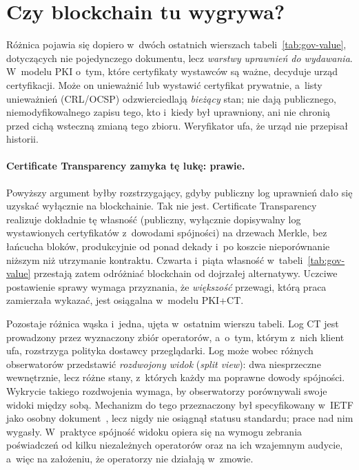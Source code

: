 \section{Czy blockchain tu wygrywa?}
\label{sec:gov-wniosek}

Różnica pojawia się dopiero w~dwóch ostatnich wierszach tabeli~\ref{tab:gov-value},
dotyczących nie pojedynczego dokumentu, lecz \emph{warstwy uprawnień do wydawania}.
W~modelu PKI o~tym, które certyfikaty wystawców są ważne, decyduje urząd certyfikacji.
Może on unieważnić lub wystawić certyfikat prywatnie, a~listy unieważnień (CRL/OCSP)
odzwierciedlają \emph{bieżący} stan; nie dają publicznego, niemodyfikowalnego
zapisu tego, kto i~kiedy był uprawniony, ani nie chronią przed cichą wsteczną
zmianą tego zbioru. Weryfikator ufa, że urząd nie przepisał historii.

\paragraph{Certificate Transparency zamyka tę lukę: prawie.} Powyższy argument
byłby rozstrzygający, gdyby publiczny log uprawnień dało się uzyskać wyłącznie
na blockchainie. Tak nie jest. Certificate Transparency~\cite{rfc6962} realizuje
dokładnie tę własność (publiczny, wyłącznie dopisywalny log wystawionych
certyfikatów z~dowodami spójności) na drzewach Merkle, bez łańcucha bloków,
produkcyjnie od ponad dekady i~po koszcie nieporównanie niższym niż utrzymanie
kontraktu. Czwarta i~piąta własność w~tabeli~\ref{tab:gov-value} przestają zatem
odróżniać blockchain od dojrzałej alternatywy. Uczciwe postawienie sprawy wymaga
przyznania, że \emph{większość} przewagi, którą praca zamierzała wykazać, jest
osiągalna w~modelu PKI+CT.

Pozostaje różnica wąska i~jedna, ujęta w~ostatnim wierszu tabeli. Log CT jest
prowadzony przez wyznaczony zbiór operatorów, a~o~tym, którym z~nich klient ufa,
rozstrzyga polityka dostawcy przeglądarki. Log może wobec różnych obserwatorów
przedstawić \emph{rozdwojony widok} (\emph{split view}): dwa niesprzeczne
wewnętrznie, lecz różne stany, z~których każdy ma poprawne dowody spójności.
Wykrycie takiego rozdwojenia wymaga, by obserwatorzy porównywali swoje widoki
między sobą. Mechanizm do tego przeznaczony był specyfikowany w~IETF jako
osobny dokument~\cite{trans-gossip}, lecz nigdy nie osiągnął statusu standardu;
prace nad nim wygasły. W~praktyce spójność widoku opiera się na wymogu
zebrania poświadczeń od kilku niezależnych operatorów oraz na ich wzajemnym
audycie, a~więc na założeniu, że operatorzy nie działają w~zmowie.

